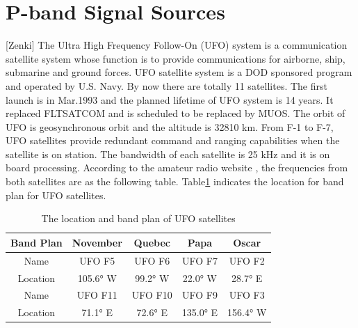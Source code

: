 \documentclass[draftcls,onecolumn]{IEEEtran}  %
\begin{document}
\section{P-band Signal Sources}
[Zenki]
\label{app:signal_source}
The Ultra High Frequency Follow-On (UFO) system is a communication satellite system whose function is to provide communications for airborne, ship, submarine and ground forces. UFO satellite system is a DOD sponsored program and operated by U.S. Navy. By now there are totally 11 satellites. The first launch is in Mar.1993 and the planned lifetime of UFO system is 14 years. It replaced FLTSATCOM and is scheduled to be replaced by MUOS. The orbit of UFO is geosynchronous orbit and the altitude is 32810 km. From F-1 to F-7, UFO satellites provide redundant command and ranging capabilities when the satellite is on station. The bandwidth of each satellite is 25 kHz and it is on board processing. According to the amateur radio website \cite{Matt:2014}, the frequencies from both satellites are as the following table. Table\ref{Table Band Plan} indicates the location for band plan for UFO satellites.

\begin{table}[ht]
\centering
\caption{The location and band plan of UFO satellites}
\begin{tabular}  {|c|c|c|c|c|}
	\hline
     \textbf{Band Plan} & \textbf{November}	& \textbf{Quebec} &	\textbf{Papa} & \textbf{Oscar} \\
    \hline
    Name & UFO F5 & UFO F6 & UFO F7 & UFO F2 \\
    \hline
     Location &	105.6° W & 99.2° W & 	22.0° W	&  28.7° E\\
    \hline
    Name & UFO F11 & UFO F10 & UFO F9  & UFO F3 \\
    \hline
    Location& 71.1° E &	72.6° E &	135.0° E &	156.4° W \\
    \hline
\end{tabular}
\label{Table Band Plan}
\end{table}
\end{document}
